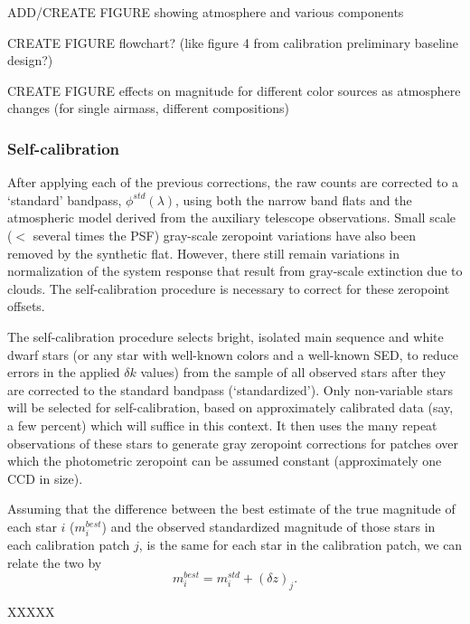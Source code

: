 \documentclass[12pt,preprint]{aastex}
\begin{document}
ADD/CREATE FIGURE showing atmosphere and various components

CREATE FIGURE flowchart? (like figure 4 from calibration preliminary
baseline design?)

CREATE FIGURE effects on magnitude for different color sources as
atmosphere changes (for single airmass, different compositions)

\subsubsection{Self-calibration}
\label{sec:selfcalib}

After applying each of the previous corrections, the raw counts are
corrected to a `standard' bandpass, $\phi^{std}(\lambda)$, using both
the narrow band flats and the atmospheric model derived from the
auxiliary telescope observations. Small scale ($<$ several times the
PSF) gray-scale zeropoint variations have also been removed by the
synthetic flat. However, there still remain variations in
normalization of the system response that result from gray-scale
extinction due to clouds. The self-calibration procedure is necessary
to correct for these zeropoint offsets.

The self-calibration procedure selects bright, isolated main sequence
and white dwarf stars (or any star with well-known colors and a
well-known SED, to reduce errors in the applied
$\delta k$ values) from the sample of all observed stars after they are
corrected to the standard bandpass (`standardized'). Only non-variable stars will be
selected for self-calibration, based on approximately calibrated data
(say, a few percent) which will suffice in this context. It then uses
the many repeat observations of these stars to generate gray zeropoint
corrections for patches over which the photometric zeropoint can be
assumed constant (approximately one CCD in size).
 
Assuming that the difference between the best estimate of the true magnitude of each star $i$
($m^{best}_i$) and the observed standardized magnitude of those stars
in each calibration patch $j$, is the same for each star in the
calibration patch, we can relate the two by
\begin{equation}
\label{eqn:zp}
m^{best}_i = m^{std}_i + (\delta z)_j. 
\end{equation}

XXXXX
\end{document}
